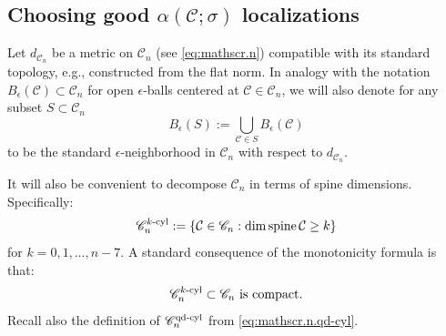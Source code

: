 \documentclass[11pt, letterpaper, reqno]{amsart}
\numberwithin{equation}{section}
\theoremstyle{remark}
\newcommand{\cC}{\mathcal{C}}
\newcommand{\spine}{\operatorname{spine}}
\begin{document}
\subsection{Choosing good $\alpha(\cC; \sigma)$ localizations}

Let $d_{\mathscr{C}_n}$ be a metric on $\mathscr{C}_n$ (see \eqref{eq:mathscr.n}) compatible with its standard topology, e.g., constructed from the flat norm. In analogy with the notation $B_\epsilon(\cC) \subset \mathscr{C}_n$ for open $\epsilon$-balls centered at $\cC \in \mathscr{C}_n$, we will also denote for any subset $S \subset \mathscr{C}_n$
\[ B_\epsilon(S) := \bigcup_{\cC \in S} B_\epsilon(\cC) \]
to be the standard $\epsilon$-neighborhood in $\mathscr{C}_n$ with respect to $d_{\mathscr{C}_n}$. 

It will also be convenient to decompose $\mathscr{C}_n$ in terms of spine dimensions. Specifically: 
\[
	\mathscr{C}_{n}^{k\textnormal{-cyl}} := \{ \cC \in \mathscr{C}_n : \dim \spine \cC \geq k \} 
\]
for $k = 0, 1, \ldots, n-7$. A standard consequence of the monotonicity formula is that:
\begin{equation} \label{eq:mathscr.k.cyl.closed}
	\mathscr{C}_{n}^{k\textnormal{-cyl}} \subset \mathscr{C}_{n} \text{ is compact}.
\end{equation}
Recall also the definition of $\mathscr{C}_n^{\textnormal{qd-cyl}}$ from \eqref{eq:mathscr.n.qd-cyl}.
\end{document}

